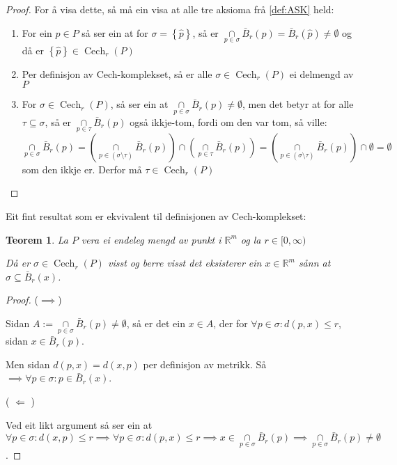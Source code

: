 \documentclass[a4paper, 12pt, norsk]{article}
\theoremstyle{plain}
\newtheorem{theorem}{Teorem}[section]
\theoremstyle{definition}
\newcommand{\Rb}{\mathbb{R}}
\newcommand{\intersect}{ \mathop{\cap}\limits }
\newcommand{\set}[1]{ \left\{ #1 \right\} } %
\DeclareMathOperator{\Cech}{Cech} %
\begin{document}
\begin{proof}
	For å visa dette, så må ein visa at alle tre aksioma frå \autoref{def:ASK} held:
	\begin{enumerate}
		\item{ For ein \( \hat{p} \in P \) så ser ein at for \( \sigma = \set{\hat{p}} \), så er \( \intersect_{p\in\sigma}\bar{B}_r(p)=\bar{B}_r(\hat{p})\neq\emptyset \) og då er \( \set{\hat{p}} \in \Cech_r(P) \) }
		\item{ Per definisjon av Cech-komplekset, så er alle \( \sigma \in \Cech_r(P) \) ei delmengd av \( P \) }
		\item{ For \( \sigma \in \Cech_r(P) \), så ser ein at \( \intersect_{p\in\sigma} \bar{B}_r(p) \neq \emptyset \), men det betyr at for alle \( \tau \subseteq \sigma \), så er \( \intersect_{p\in\tau} \bar{B}_r(p) \) også ikkje-tom, fordi om den var tom, så ville: 
			\[ 
				\intersect_{p\in\sigma} \bar{B}_r(p) = \left( \intersect_{p\in(\sigma\setminus\tau)} \bar{B}_r(p) \right) \intersect \left( \intersect_{p\in\tau} \bar{B}_r(p) \right) = \left( \intersect_{p\in(\sigma\setminus\tau)} \bar{B}_r(p) \right) \intersect \emptyset = \emptyset 
			\] 
			som den ikkje er. Derfor må \( \tau \in \Cech_r(P) \) }
	\end{enumerate}
\end{proof}

Eit fint resultat som er ekvivalent til definisjonen av Cech-komplekset:

\begin{theorem}
	La $P$ vera ei endeleg mengd av punkt i $\Rb^m$ og la $r\in[0, \infty)$

	Då er \( \sigma \in \Cech_r(P) \) visst og berre visst det eksisterer ein \( x \in \Rb^m \) sånn at \( \sigma \subseteq \bar{B}_r(x) \).
\end{theorem}

\begin{proof}
	($\implies$)
	
	Sidan $A:=\intersect_{p\in\sigma}\bar{B}_r(p)\neq\emptyset$, så er det ein $x\in A$, der for $\forall p\in\sigma: d(p,x)\leq r$, sidan $x\in\bar{B}_r(p)$.
	
	Men sidan $d(p,x)=d(x,p)$ per definisjon av metrikk. 
	Så $\implies \forall p\in\sigma: p \in \bar{B}_r(x)$.
	
	( \( \Longleftarrow \) )
	
	Ved eit likt argument så ser ein at  $\forall p \in \sigma : d(x, p) \leq r \implies \forall p \in \sigma : d(p, x) \leq r \implies x \in \intersect_{p \in \sigma} \bar{B}_r(p) \implies \intersect_{p \in \sigma} \bar{B}_r(p) \neq \emptyset$.
\end{proof}
\end{document}
